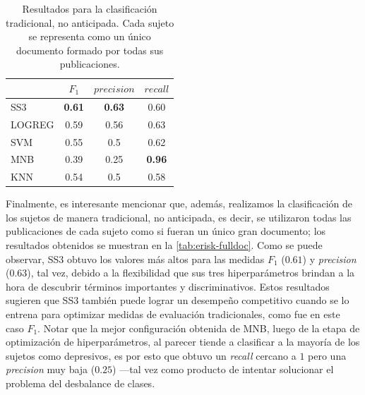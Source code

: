 \begin{table}[t!]
\centering
\caption{Resultados para la clasificación tradicional, no anticipada. Cada sujeto se representa como un único documento formado por todas sus publicaciones.}
\label{tab:erisk-fulldoc}
\begin{tabular}{l c c c}
\hline
& $F_1$ & $precision$ & $recall$ \\ \hline
SS3 & \textbf{0.61} & \textbf{0.63} & 0.60 \\
LOGREG & 0.59 & 0.56 & 0.63  \\
SVM & 0.55 & 0.5 & 0.62 \\
MNB & 0.39 & 0.25 & \textbf{0.96} \\
KNN & 0.54 & 0.5 & 0.58 \\ \hline

\hline
\end{tabular}
\end{table}

Finalmente, es interesante mencionar que, además, realizamos la clasificación de los sujetos de manera tradicional, no anticipada, es decir, se utilizaron todas las publicaciones de cada sujeto como si fueran un único gran documento; los resultados obtenidos se muestran en la \autoref{tab:erisk-fulldoc}.
Como se puede observar, SS3 obtuvo los valores más altos para las medidas $F_1$ ($0.61$) y \emph{precision} ($0.63$), tal vez, debido a la flexibilidad que sus tres hiperparámetros brindan a la hora de descubrir términos importantes y discriminativos. Estos resultados sugieren que SS3 también puede lograr un desempeño competitivo cuando se lo entrena para optimizar medidas de evaluación tradicionales, como fue en este caso $F_1$.
Notar que la mejor configuración obtenida de \ac{MNB}, luego de la etapa de optimización de hiperparámetros, al parecer tiende a clasificar a la mayoría de los sujetos como depresivos, es por esto que obtuvo un \emph{recall} cercano a $1$ pero una \emph{precision} muy baja ($0.25$) ---tal vez como producto de intentar solucionar el problema del desbalance de clases.


